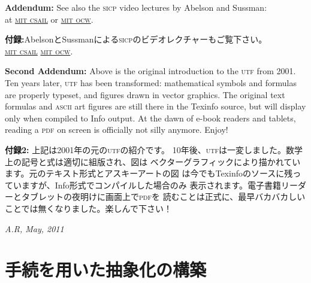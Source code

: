 \documentclass[8pt,oneside]{book}
\newcommand{\acronym}[1]{\textsc{\MakeLowercase{#1}}}
\begin{document}
\vspace{1.0em}
\noindent
\textbf{Addendum:} See also the \acronym{SICP} video lectures by Abelson and Sussman:\\
at \href{http://groups.csail.mit.edu/mac/classes/6.001/abelson-sussman-lectures/}{\acronym{MIT CSAIL}} or 
\href{http://ocw.mit.edu/courses/electrical-engineering-and-computer-science/6-001-structure-and-interpretation-of-computer-programs-spring-2005/video-lectures/}{\acronym{MIT OCW}}.

\textbf{付録:}AbelsonとSussmanによる\acronym{SICP}のビデオレクチャーもご覧下さい。\\
\href{http://groups.csail.mit.edu/mac/classes/6.001/abelson-sussman-lectures/}{\acronym{MIT CSAIL}}
\href{http://ocw.mit.edu/courses/electrical-engineering-and-computer-science/6-001-structure-and-interpretation-of-computer-programs-spring-2005/video-lectures/}{\acronym{MIT OCW}}.


\vspace{0.5em}
\noindent 
\textbf{Second Addendum:} Above is the original introduction to the \acronym{UTF} 
from 2001. Ten years later, \acronym{UTF} has been transformed: mathematical 
symbols and formulas are properly typeset, and figures drawn in 
vector graphics. The original text formulas and \acronym{ASCII} art figures 
are still there in the Texinfo source, but will display only when compiled 
to Info output. At the dawn of e-book readers and tablets, reading a 
\acronym{PDF} on screen is officially not silly anymore. Enjoy!

\noindent
\textbf{付録2:} 上記は2001年の元の\acronym{UTF}の紹介です。
10年後、\acronym{UTF}は一変しました。数学上の記号と式は適切に組版され、図は
ベクターグラフィックにより描かれています。元のテキスト形式とアスキーアートの図
は今でもTexinfoのソースに残っていますが、Info形式でコンパイルした場合のみ
表示されます。電子書籍リーダーとタブレットの夜明けに画面上で\acronym{PDF}を
読むことは正式に、最早バカバカしいことでは無くなりました。楽しんで下さい！

\vspace{0.5em}
\noindent
\textit{A.R, May, 2011}

\label{Chapter 1}
\chapter{手続を用いた抽象化の構築}

\end{document}
